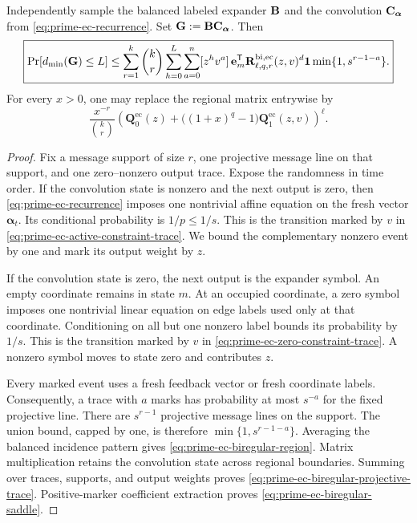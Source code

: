 \begin{theorem}
\label{thm:prime-ec-biregular-projective-trace}
Independently sample the balanced labeled expander $\mathbf B$ and the convolution
$\mathbf C_{\boldsymbol\alpha}$ from \eqref{eq:prime-ec-recurrence}.  Set
$\mathbf G:=\mathbf B\mathbf C_{\boldsymbol\alpha}$.  Then
\begin{equation}
 \boxed{
 \Pr[d_{\min}(\mathbf G)\leq L]
 \leq
 \sum_{r=1}^k\binom{k}{r}
 \sum_{h=0}^L\sum_{a=0}^n[z^hv^a]\,
 \mathbf e_m^{\mathsf T}
 \mathbf R^{\mathrm{bi,ec}}_{\ell,q,r}(z,v)^d\boldsymbol 1
 \min\{1,s^{r-1-a}\}.
 }
 \label{eq:prime-ec-biregular-projective-trace}
\end{equation}
For every $x>0$, one may replace the regional matrix entrywise by
\begin{equation}
 \frac{x^{-r}}{\binom{k}{r}}
 \left(
  \mathbf Q^{\mathrm{ec}}_0(z)
  +\bigl((1+x)^q-1\bigr)\mathbf Q^{\mathrm{ec}}_1(z,v)
 \right)^\ell.
 \label{eq:prime-ec-biregular-saddle}
\end{equation}
\end{theorem}

\begin{proof}
Fix a message support of size $r$, one projective message line on that
support, and one zero--nonzero output trace.  Expose the randomness in time
order.  If the convolution state is nonzero and the next output is zero,
then \eqref{eq:prime-ec-recurrence} imposes one nontrivial affine equation on
the fresh vector $\boldsymbol\alpha_t$.  Its conditional probability is
$1/p\leq1/s$.  This is the transition marked by $v$ in
\eqref{eq:prime-ec-active-constraint-trace}.  We bound the complementary
nonzero event by one and mark its output weight by $z$.

If the convolution state is zero, the next output is the expander symbol.
An empty coordinate remains in state $m$.  At an occupied coordinate, a zero
symbol imposes one nontrivial linear equation on edge labels used only at
that coordinate.  Conditioning on all but one nonzero label bounds its
probability by $1/s$.  This is the transition marked by $v$ in
\eqref{eq:prime-ec-zero-constraint-trace}.  A nonzero symbol moves to state
zero and contributes $z$.

Every marked event uses a fresh feedback vector or fresh coordinate labels.
Consequently, a trace with $a$ marks has probability at most $s^{-a}$ for
the fixed projective line.  There are $s^{r-1}$ projective message lines on
the support.  The union bound, capped by one, is therefore
$\min\{1,s^{r-1-a}\}$.  Averaging the balanced incidence pattern gives
\eqref{eq:prime-ec-biregular-region}.  Matrix multiplication retains the
convolution state across regional boundaries.  Summing over traces, supports,
and output weights proves
\eqref{eq:prime-ec-biregular-projective-trace}.  Positive-marker coefficient
extraction proves \eqref{eq:prime-ec-biregular-saddle}.
\end{proof}

